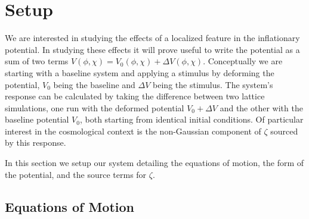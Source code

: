 
\section{Setup} \label{sec:setup}
We are interested in studying the effects of a localized feature in the inflationary potential.
In studying these effects it will prove useful to write the potential as a sum of two terms $V(\phi,\chi) = V_0(\phi,\chi) + \Delta V(\phi,\chi)$.
Conceptually we are starting with a baseline system and applying a stimulus by deforming the potential, $V_0$ being the baseline and $\Delta V$ being the stimulus.
The system's response can be calculated by taking the difference between two lattice simulations, one run with the deformed potential $V_0+\Delta V$ and the other with the baseline potential $V_0$, both starting from identical initial conditions.
Of particular interest in the cosmological context is the non-Gaussian component of $\zeta$ sourced by this response.

In this section we setup our system detailing the equations of motion, the form of the potential, and the source terms for $\zeta$.

\subsection{Equations of Motion}

